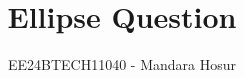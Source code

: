 \documentclass[journal]{IEEEtran}
\begin{document}

\vspace{3cm}

\title{Ellipse Question}
\author{EE24BTECH11040 - Mandara Hosur}
{\let\newpage\relax\maketitle}

\renewcommand{\thefigure}{\theenumi}
\renewcommand{\thetable}{\theenumi}
\setlength{\intextsep}{10pt} %


\renewcommand{\thetable}{\theenumi}
\end{document}
